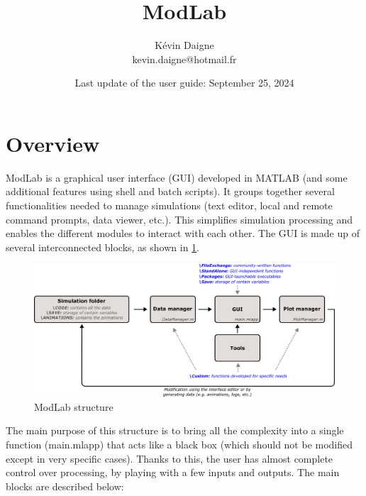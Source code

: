 \documentclass{article}
\title{\textbf{ModLab}}
\author{Kévin Daigne\\kevin.daigne@hotmail.fr}
\date{Last update of the user guide: September 25, 2024}
\begin{document}
\maketitle

\tableofcontents

\newpage

\section{Overview}

ModLab is a graphical user interface (GUI) developed in MATLAB (and some additional features using shell and batch scripts). It groups together several functionalities needed to manage simulations (text editor, local and remote command prompts, data viewer, etc.). This simplifies simulation processing and enables the different modules to interact with each other. The GUI is made up of several interconnected blocks, as shown in \cref{modlabArch}.

\begin{figure}[H]
\centering
\includegraphics[width=\textwidth]{architecture.pdf}
\caption{ModLab structure}
\label{modlabArch}
\end{figure}

The main purpose of this structure is to bring all the complexity into a single function (main.mlapp) that acts like a black box (which should not be modified except in very specific cases). Thanks to this, the user has almost complete control over processing, by playing with a few inputs and outputs. The main blocks are described below:
\end{document}

